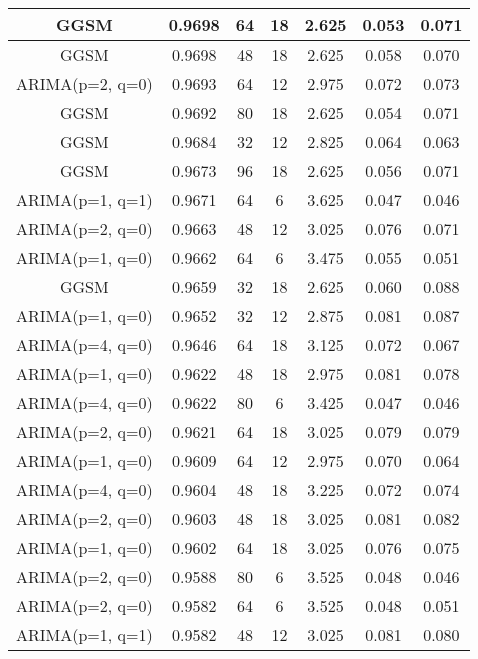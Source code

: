 \begin{table*}[h!]
\begin{tabular}{|c|c|c|c|c|c|c|}
        \hline
        GGSM & 0.9698 & 64 & 18 & 2.625 &  0.053 & 0.071 \\
        \hline
        GGSM & 0.9698 & 48 & 18 & 2.625 &  0.058 & 0.070 \\
        \hline
        ARIMA(p=2, q=0) & 0.9693 & 64 & 12 & 2.975 &  0.072 & 0.073 \\
        \hline
        GGSM & 0.9692 & 80 & 18 & 2.625 &  0.054 & 0.071 \\
        \hline
        GGSM & 0.9684 & 32 & 12 & 2.825 &  0.064 & 0.063 \\
        \hline
        GGSM & 0.9673 & 96 & 18 & 2.625 &  0.056 & 0.071 \\
        \hline
        ARIMA(p=1, q=1) & 0.9671 & 64 & 6 & 3.625 &  0.047 & 0.046 \\
        \hline
        ARIMA(p=2, q=0) & 0.9663 & 48 & 12 & 3.025 &  0.076 & 0.071 \\
        \hline
        ARIMA(p=1, q=0) & 0.9662 & 64 & 6 & 3.475 &  0.055 & 0.051 \\
        \hline
        GGSM & 0.9659 & 32 & 18 & 2.625 &  0.060 & 0.088 \\
        \hline
        ARIMA(p=1, q=0) & 0.9652 & 32 & 12 & 2.875 &  0.081 & 0.087 \\
        \hline
        ARIMA(p=4, q=0) & 0.9646 & 64 & 18 & 3.125 &  0.072 & 0.067 \\
        \hline
        ARIMA(p=1, q=0) & 0.9622 & 48 & 18 & 2.975 &  0.081 & 0.078 \\
        \hline
        ARIMA(p=4, q=0) & 0.9622 & 80 & 6 & 3.425 &  0.047 & 0.046 \\
        \hline
        ARIMA(p=2, q=0) & 0.9621 & 64 & 18 & 3.025 &  0.079 & 0.079 \\
        \hline
        ARIMA(p=1, q=0) & 0.9609 & 64 & 12 & 2.975 &  0.070 & 0.064 \\
        \hline
        ARIMA(p=4, q=0) & 0.9604 & 48 & 18 & 3.225 &  0.072 & 0.074 \\
        \hline
        ARIMA(p=2, q=0) & 0.9603 & 48 & 18 & 3.025 &  0.081 & 0.082 \\
        \hline
        ARIMA(p=1, q=0) & 0.9602 & 64 & 18 & 3.025 &  0.076 & 0.075 \\
        \hline
        ARIMA(p=2, q=0) & 0.9588 & 80 & 6 & 3.525 &  0.048 & 0.046 \\
        \hline
        ARIMA(p=2, q=0) & 0.9582 & 64 & 6 & 3.525 &  0.048 & 0.051 \\
        \hline
        ARIMA(p=1, q=1) & 0.9582 & 48 & 12 & 3.025 &  0.081 & 0.080 \\

\end{tabular}
\end{table*}
